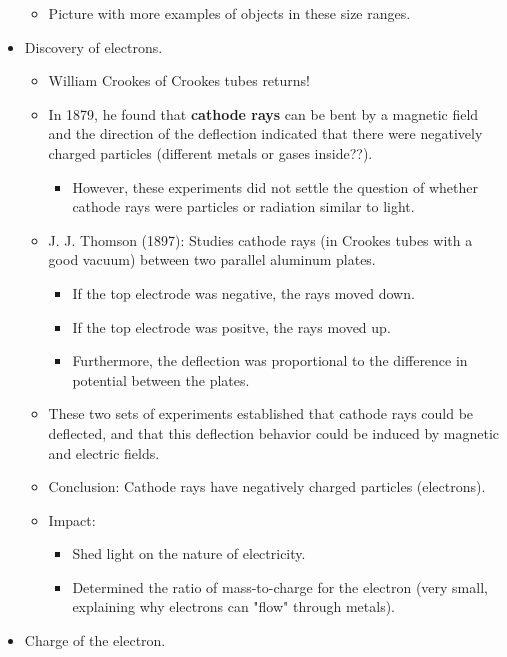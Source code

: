 \documentclass[../notes.tex]{subfiles}
\begin{document}
\begin{itemize}
\begin{itemize}
        \item Picture with more examples of objects in these size ranges.
    \end{itemize}
    \item Discovery of electrons.
    \begin{itemize}
        \item William Crookes of Crookes tubes returns!
        \item In 1879, he found that \textbf{cathode rays} can be bent by a magnetic field and the direction of the deflection indicated that there were negatively charged particles (different metals or gases inside??).
        \begin{itemize}
            \item However, these experiments did not settle the question of whether cathode rays were particles or radiation similar to light.
        \end{itemize}
        \item J. J. Thomson (1897): Studies cathode rays (in Crookes tubes with a good vacuum) between two parallel aluminum plates.
        \begin{itemize}
            \item If the top  electrode was negative, the rays moved down.
            \item If the top  electrode was positve, the rays moved up.
            \item Furthermore, the deflection was proportional to the difference in potential between the plates.
        \end{itemize}
        \item These two sets of experiments established that cathode rays could be deflected, and that this deflection behavior could be induced by magnetic and electric fields.
        \item Conclusion: Cathode rays have negatively charged particles (electrons).
        \item Impact:
        \begin{itemize}
            \item Shed light on the nature of electricity.
            \item Determined the ratio of mass-to-charge for the electron (very small, explaining why electrons can "flow" through metals).
        \end{itemize}
    \end{itemize}
    \item Charge of the electron.

\end{itemize}
\end{document}
